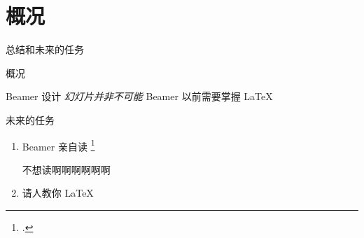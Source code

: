 \section{概况}

\begin{frame}{总结和未来的任务}
  \begin{block}{概况}
  \begin{enumerate}
    \okitem Beamer 设计 \emph{幻灯片并非不可能}
    \butitem Beamer 以前需要掌握 \LaTeX
  \end{enumerate}
  \end{block}
  
  \begin{block}{未来的任务}
  \begin{enumerate}
  \item
    Beamer 亲自读 \footcite{beamerguide}
    \begin{itemize}
      \ngitem 不想读啊啊啊啊啊啊
    \end{itemize}
  \item
    请人教你 \LaTeX
  \end{enumerate}
  \end{block}
  
\end{frame}

